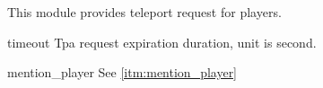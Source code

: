 
This module provides teleport request for players.




\begin{Configuration}
    \item[timeout]{
        Tpa request expiration duration, unit is second.
    }
    \item[mention\_player] {
        See \ref{itm:mention_player}
    }

\end{Configuration}

